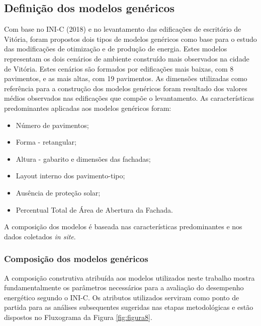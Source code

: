 \subsection{Definição dos modelos genéricos}
Com base no INI-C (2018) e no levantamento das edificações de escritório de Vitória, foram 
propostos dois tipos de modelos genéricos como base para o estudo das modificações de 
otimização e de produção de energia. Estes modelos representam os dois cenários de ambiente 
construído mais observados na cidade de Vitória. Estes cenários são formados por edificações 
mais baixas, com 8 pavimentos, e as mais altas, com 19 pavimentos. As dimensões utilizadas 
como referência para a construção dos modelos genéricos foram resultado dos valores médios 
observados nas edificações que compõe o levantamento.\vspace*{0.3cm} \newline
As características predominantes aplicadas aos modelos genéricos foram:
    \begin{itemize}
        \item Número de pavimentos;
        \item Forma - retangular;
        \item Altura - gabarito e dimensões das fachadas;
        \item Layout interno dos pavimento-tipo;
        \item Ausência de proteção solar;
        \item Percentual Total de Área de Abertura da Fachada.
    \end{itemize}
A composição dos modelos é baseada nas características predominantes e nos dados coletados 
\textit{in site}.
\subsubsection{Composição dos modelos genéricos}
A composição construtiva atribuída aos modelos utilizados neste trabalho mostra fundamentalmente 
os parâmetros necessários para a avaliação do desempenho energético segundo o INI-C. Os 
atributos utilizados serviram como ponto de partida para as análises subsequentes sugeridas nas 
etapas metodológicas e estão dispostos no Fluxograma da Figura \ref{fig:figura8}.\vspace*{0.3cm}

